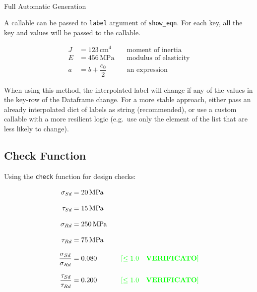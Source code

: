 \documentclass[
  letterpaper,
  DIV=11,
  numbers=noendperiod,
  fleqn]{scrartcl}
\makeatletter
\let\oldparagraph\paragraph
\renewcommand{\paragraph}{
    \@ifstar
      \xxxParagraphStar
      \xxxParagraphNoStar
  }
\newcommand{\xxxParagraphStar}[1]{\oldparagraph*{#1}\mbox{}}
\newcommand{\xxxParagraphNoStar}[1]{\oldparagraph{#1}\mbox{}}
\makeatother
\begin{document}
\paragraph{Full Automatic Generation}\label{full-automatic-generation}

A callable can be passed to \texttt{label} argument of
\texttt{show\_eqn}. For each key, all the key and values will be passed
to the callable.

\begin{align}
J & = 123{\,}\text{cm}^{4} & \quad\text{moment of inertia}  \label{eq-QUARTO_EXAMPLE-3lb6w5uv}  \\[8pt]
 E & = 456{\,}\text{MPa} & \quad\text{modulus of elasticity}  \label{eq-QUARTO_EXAMPLE-1mp6ez2n}  \\[8pt]
 a & = b + \dfrac{c_{0}}{2} & \quad\text{an expression}  \label{eq-QUARTO_EXAMPLE-5kh184ai} 
\end{align}

\begin{tcolorbox}[enhanced jigsaw, colback=white, toprule=.15mm, coltitle=black, arc=.35mm, opacitybacktitle=0.6, rightrule=.15mm, opacityback=0, leftrule=.75mm, titlerule=0mm, colbacktitle=quarto-callout-note-color!10!white, left=2mm, bottomtitle=1mm, breakable, toptitle=1mm, title=\textcolor{quarto-callout-note-color}{\faInfo}\hspace{0.5em}{Note}, bottomrule=.15mm, colframe=quarto-callout-note-color-frame]

When using this method, the interpolated label will change if any of the
values in the key-row of the Dataframe change. For a more stable
approach, either pass an already interpolated dict of labels as string
(recommended), or use a custom callable with a more resilient logic
(e.g.~use only the element of the list that are less likely to change).

\end{tcolorbox}

\subsection{Check Function}\label{check-function}

Using the \texttt{check} function for design checks:

\begin{align}
\sigma_{Sd} & = 20{\,}\text{MPa} &    \\[8pt]
 \tau_{Sd} & = 15{\,}\text{MPa} &    \\[8pt]
 \sigma_{Rd} & = 250{\,}\text{MPa} &    \\[8pt]
 \tau_{Rd} & = 75{\,}\text{MPa} &    \\[8pt]
 \dfrac{\sigma_{Sd}}{\sigma_{Rd}} & = 0.080 & \quad\text{$\textcolor{green}{\left[\le1.0\quad \textbf{VERIFICATO}\right]}$}  \\[8pt]
 \dfrac{\tau_{Sd}}{\tau_{Rd}} & = 0.200 & \quad\text{$\textcolor{green}{\left[\le1.0\quad \textbf{VERIFICATO}\right]}$} 
\end{align}
\end{document}

